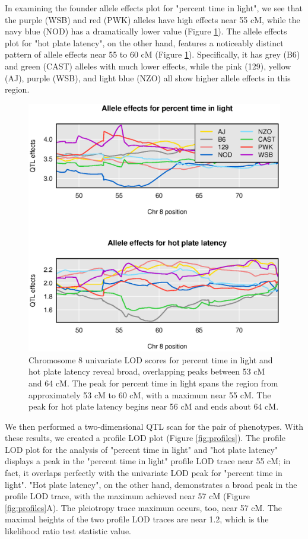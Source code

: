 \documentclass[12pt,twoside, lineno]{gsajnl}
\begin{document}
In examining the founder allele effects plot for "percent time in
light", we see that the purple (WSB) and red (PWK) alleles have high
effects near 55 cM, while the navy blue (NOD) has a dramatically lower
value (Figure \ref{fig:chr8-effects}). The allele effects plot for
"hot plate latency", on the other hand, features a noticeably distinct
pattern of allele effects near 55 to 60 cM (Figure
\ref{fig:chr8-effects}). Specifically, it has grey (B6) and green
(CAST) alleles with much lower effects, while the pink (129), yellow
(AJ), purple (WSB), and light blue (NZO) all show higher allele
effects in this region.

\begin{figure}
\includegraphics[width = \textwidth]{../Rmd/coefs.eps}
\caption{Chromosome 8 univariate LOD scores for percent time in light
  and hot plate latency reveal broad, overlapping peaks between 53 cM
  and 64 cM. The peak for percent time in light spans the region from
  approximately 53 cM to 60 cM, with a maximum near 55 cM. The peak
  for hot plate latency begins near 56 cM and ends about 64 cM.}
\label{fig:chr8-effects}
\end{figure}




We then performed a two-dimensional QTL scan for the pair of
phenotypes. With these results, we created a profile LOD plot (Figure
\ref{fig:profiles}). The profile LOD plot for the analysis of "percent
time in light" and "hot plate latency" displays a peak in the "percent
time in light" profile LOD trace near 55 cM; in fact, it overlaps
perfectly with the univariate LOD peak for "percent time in light".
"Hot plate latency", on the other hand, demonstrates a broad peak in
the profile LOD trace, with the maximum achieved near 57 cM (Figure
\ref{fig:profiles}A). The pleiotropy trace maximum occurs, too, near
57 cM. The maximal heights of the two profile LOD traces are near 1.2,
which is the likelihood ratio test statistic value.
\end{document}
